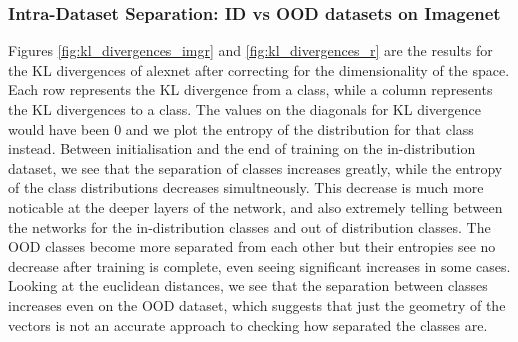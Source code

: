 \documentclass{article}
\begin{document}
                    
    
            \subsubsection{Intra-Dataset Separation: ID vs OOD datasets on Imagenet}
                Figures \ref{fig:kl_divergences_imgr} and \ref{fig:kl_divergences_r} are the results for the KL divergences of alexnet after correcting for the dimensionality of the space. Each row represents the KL divergence from a class, while a column represents the KL divergences to a class. The values on the diagonals for KL divergence would have been 0 and we plot the entropy of the distribution for that class instead.  Between initialisation and the end of training on the in-distribution dataset, we see that the separation of classes increases greatly, while the entropy of the class distributions decreases simultneously. This decrease is much more noticable at the deeper layers of the network, and also extremely telling between the networks for the in-distribution classes and out of distribution classes. The OOD classes become more separated from each other but their entropies see no decrease after training is complete, even seeing significant increases in some cases. Looking at the euclidean distances, we see that the separation between classes increases even on the OOD dataset, which suggests that just the geometry of the vectors is not an accurate approach to checking how separated the classes are. 
\end{document}
